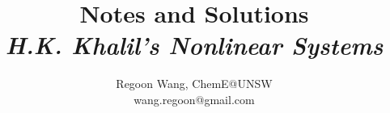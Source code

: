\documentclass[12pt]{report}
\begin{document}
 
\title{\textbf{Notes and Solutions} \\ \large \textit{H.K. Khalil's Nonlinear Systems}}
\author{Regoon Wang, ChemE@UNSW \\ wang.regoon@gmail.com} 
 
\maketitle

\tableofcontents

 
 
\end{document}
